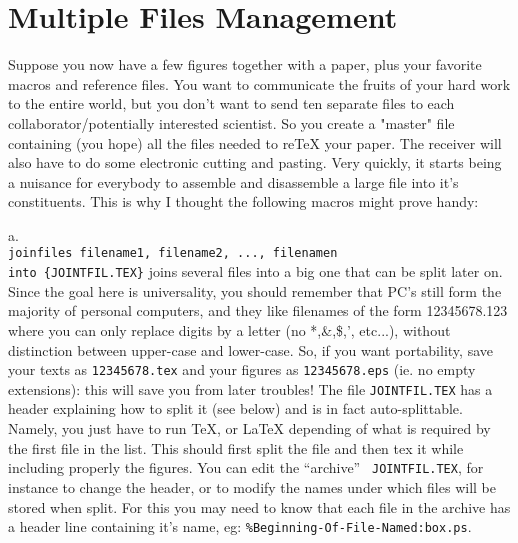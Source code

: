 {{{{{{{{{{{{{{{\section{Multiple Files Management}
Suppose you now have a few figures together with a paper, plus your favorite
macros and reference files. You want to communicate the fruits of your hard
work to the entire world, but you don't want to send ten separate files to
each collaborator/potentially interested scientist. So you create a "master"
file containing (you hope) all the files needed to re\TeX{} your paper. The
receiver will also have to do some electronic cutting and pasting. Very
quickly, it starts being a nuisance for everybody to assemble and disassemble
a large file into it's constituents. This is why I thought the following
macros might prove handy:

\item{a.}{\tt\\joinfiles filename1, filename2, ..., filenamen \\into%
\{JOINTFIL.TEX\}}\hfil\break
joins several files into a big one that can be split later on. Since
the goal here is universality, you should remember that PC's still form
the majority of personal computers, and they like filenames of the form
12345678.123 where you can only replace digits by a letter (no
*,\&,\$,', etc...), without distinction between upper-case and
lower-case. So, if you want portability, save your texts as
{\tt12345678.tex} and your figures as {\tt12345678.eps} (ie. no
empty extensions): this will save you from later troubles!
The file {\tt JOINTFIL.TEX} has a header explaining how to split
it (see below) and is in fact auto-splittable. Namely, you just have to
run \TeX, or \LaTeX{} depending of what is required by the first file in
the list. This should first split the file and then tex it while
including properly the figures. You can edit the ``archive'' {\tt
JOINTFIL.TEX}, for instance to change the header, or to modify the names
under which files will be stored when split. For this you may need to
know that each file in the archive has a header line containing it's
name, eg:\hfil\break
{\tt\%Beginning-Of-File-Named:box.ps}.

}}}}}}}}}}}}}}}
